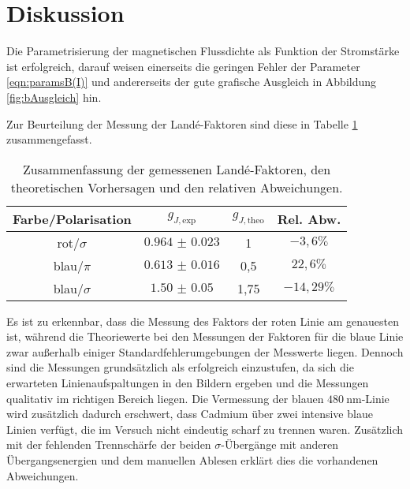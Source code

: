 \section{Diskussion}
\label{sec:Diskussion}

Die Parametrisierung der magnetischen Flussdichte als Funktion der Stromstärke ist erfolgreich, darauf weisen einerseits die geringen Fehler der Parameter \eqref{eqn:paramsB(I)} und andererseits der gute grafische Ausgleich in Abbildung \ref{fig:bAusgleich} hin.

Zur Beurteilung der Messung der Landé-Faktoren sind diese in Tabelle \ref{tab:zusammenfassung} zusammengefasst.

\begin{table}[htp]
	\begin{center}
    \caption{Zusammenfassung der gemessenen Landé-Faktoren, den theoretischen Vorhersagen und den relativen Abweichungen.}
    \label{tab:zusammenfassung}
		\begin{tabular}{cccc}
		\toprule
			{Farbe/Polarisation} & {$g_{J,\text{exp}}$} & {$g_{J,\text{theo}}$} & {Rel. Abw.}\\
			\midrule
			 rot/$\sigma$  & $\num{0.964(23)}$ & 1 & $-3{,}6\%$\\
			 blau/$\pi$    & $\num{0.613(16)}$ & 0,5 & $22{,}6\%$\\
       blau/$\sigma$ &  $\num{1.50(5)}$  & 1,75 & $-14{,}29\%$\\
		\bottomrule
		\end{tabular}
	\end{center}
\end{table}

Es ist zu erkennbar, dass die Messung des Faktors der roten Linie am genauesten ist, während die Theoriewerte bei den Messungen der Faktoren für die blaue Linie zwar außerhalb einiger Standardfehlerumgebungen der Messwerte liegen. Dennoch sind die Messungen grundsätzlich als erfolgreich einzustufen, da sich die erwarteten Linienaufspaltungen in den Bildern ergeben und die Messungen qualitativ im richtigen Bereich liegen. Die Vermessung der blauen $\SI{480}{\nano\meter}$-Linie wird zusätzlich dadurch erschwert, dass Cadmium über zwei intensive blaue Linien verfügt, die im Versuch nicht eindeutig scharf zu trennen waren. Zusätzlich mit der fehlenden Trennschärfe der beiden $\sigma$-Übergänge mit anderen Übergangsenergien und dem manuellen Ablesen erklärt dies die vorhandenen Abweichungen.

